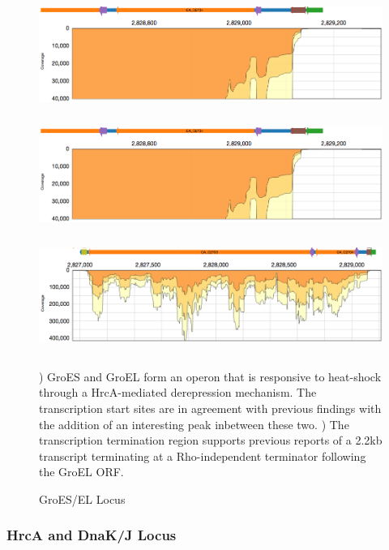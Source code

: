 \begin{figure}
\small
{\includegraphics[width=\textwidth,height=1.5in]{images/Assembly/Examples/GroESL/GroESL-TSS.png}
\label{fig:7a}}
{\includegraphics[width=\textwidth,height=1.5in]{images/Assembly/Examples/GroESL/GroESL-TSS.png}
\label{fig:7b}}
{\includegraphics[width=\textwidth,height=1.5in]{images/Assembly/Examples/GroESL/GroESL-curated.png}
\label{fig:7c}}
\caption{GroES/EL Locus}
) GroES and GroEL form an operon that is responsive to heat-shock through a HrcA-mediated derepression mechanism. The transcription start sites are in agreement with previous findings with the addition of an interesting peak inbetween these two. ) The transcription termination region supports previous reports of a 2.2kb transcript terminating at a Rho-independent terminator following the GroEL ORF.
\end{figure}

\subsubsection{HrcA and DnaK/J Locus}
